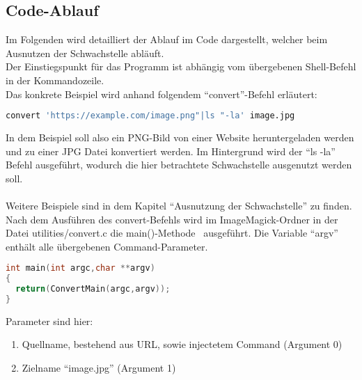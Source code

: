 \newpage
\subsection{Code-Ablauf}\label{subsec:code-ablauf}

Im Folgenden wird detailliert der Ablauf im Code dargestellt, welcher beim Ausnutzen der Schwachstelle abläuft.\\

Der Einstiegspunkt für das Programm ist abhängig vom übergebenen Shell-Befehl in der Kommandozeile.\\

Das konkrete Beispiel wird anhand folgendem "`convert"'-Befehl erläutert:

\begin{lstlisting}[language=Bash, caption=Beispielbefehl Codeablauf,label={lst:codeablaufbeispiel}]
convert 'https://example.com/image.png"|ls "-la' image.jpg
\end{lstlisting}
\vspace{5mm}

In dem Beispiel soll also ein PNG-Bild von einer Website heruntergeladen werden und zu einer JPG Datei konvertiert werden.
Im Hintergrund wird der "`ls -la"' Befehl ausgeführt, wodurch die hier betrachtete Schwachstelle ausgenutzt werden soll.\\\\
Weitere Beispiele sind in dem Kapitel "`Ausnutzung der Schwachstelle"' zu finden. \\

Nach dem Ausführen des convert-Befehls wird im ImageMagick-Ordner in der Datei utilities/convert.c die main()-Methode~\cite{DeklarationMain} ausgeführt.
Die Variable "`argv"' enthält alle übergebenen Command-Parameter.

\begin{lstlisting}[firstnumber=90, language=C, caption=utilities/convert.c Einstieg main(),label={lst:lstlisting}]
int main(int argc,char **argv)
{
  return(ConvertMain(argc,argv));
}
\end{lstlisting}
\vspace{5mm}

Parameter sind hier:
\begin{enumerate}[\itemsep=1em]
  \item Quellname, bestehend aus URL, sowie injectetem Command (Argument 0)
  \item Zielname "`image.jpg"' (Argument 1)
\end{enumerate}

